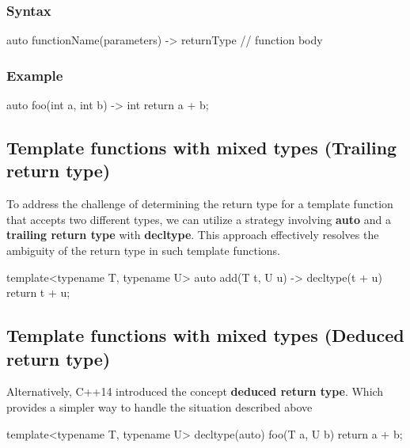 \documentclass{report}
\begin{document}
    \subsubsection{Syntax}
    \bigbreak \noindent 
    \begin{cppcode}
    auto functionName(parameters) -> returnType {
        // function body
    }
    \end{cppcode}

    \bigbreak \noindent 
    \subsubsection{Example}
    \bigbreak \noindent 
    \begin{cppcode}
    auto foo(int a, int b) -> int {
        return a + b;
    }
    \end{cppcode}

    \bigbreak \noindent 
    \subsection{Template functions with mixed types (Trailing return type)}
    \bigbreak \noindent 
    \begin{concept}
        To address the challenge of determining the return type for a template function that accepts two different types, we can utilize a strategy involving \textbf{auto} and a \textbf{trailing return type} with \textbf{decltype}. This approach effectively resolves the ambiguity of the return type in such template functions.
    \end{concept}
    \bigbreak \noindent 
    \begin{cppcode}
        template<typename T, typename U>
        auto add(T t, U u) -> decltype(t + u) {
            return t + u;
        }
    \end{cppcode}

    \pagebreak 
    \subsection{Template functions with mixed types (Deduced return type)}
    Alternatively, C++14 introduced the concept \textbf{deduced return type}. Which provides a simpler way to handle the situation described above
    \bigbreak \noindent 
    \begin{cppcode}
        template<typename T, typename U>
        decltype(auto) foo(T a, U b)  {
            return a + b;
        }
    \end{cppcode}
\end{document}

